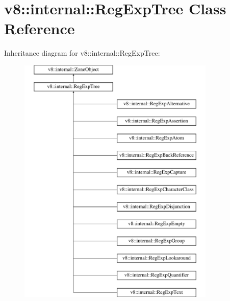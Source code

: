 \hypertarget{classv8_1_1internal_1_1RegExpTree}{}\section{v8\+:\+:internal\+:\+:Reg\+Exp\+Tree Class Reference}
\label{classv8_1_1internal_1_1RegExpTree}
Inheritance diagram for v8\+:\+:internal\+:\+:Reg\+Exp\+Tree\+:\begin{figure}[H]
\begin{center}
\leavevmode
\includegraphics[height=12.000000cm]{classv8_1_1internal_1_1RegExpTree}
\end{center}
\end{figure}
